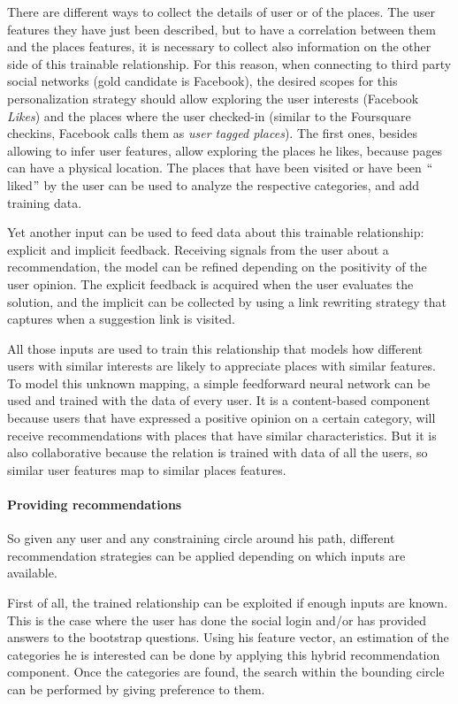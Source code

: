 There are different ways to collect the details of user or of the places. The user features they have just been described, but to have a correlation between them and the places features, it is necessary to collect also information on the other side of this trainable relationship. For this reason, when connecting to third party social networks (gold candidate is Facebook), the desired scopes for this personalization strategy should allow exploring the user interests (Facebook \textit{Likes}) and the places where the user checked-in (similar to the Foursquare checkins, Facebook calls them as \textit{user tagged places}). The first ones, besides allowing to infer user features, allow exploring the places he likes, because pages can have a physical location. The places that have been visited or have been $``$liked$"$  by the user can be used to analyze the respective categories, and add training data.

Yet another input can be used to feed data about this trainable relationship: explicit and implicit feedback. Receiving signals from the user about a recommendation, the model can be refined depending on the positivity of the user opinion. The explicit feedback is acquired when the user evaluates the solution, and the implicit can be collected by using a link rewriting strategy that captures when a suggestion link is visited.

All those inputs are used to train this relationship that models how different users with similar interests are likely to appreciate places with similar features. To model this unknown mapping, a simple feedforward neural network can be used and trained with the data of every user. It is a content-based component because users that have expressed a positive opinion on a certain category, will receive recommendations with places that have similar characteristics. But it is also collaborative because the relation is trained with data of all the users, so similar user features map to similar places features.

\paragraph{Providing recommendations}
So given any user and any constraining circle around his path, different recommendation strategies can be applied depending on which inputs are available.

First of all, the trained relationship can be exploited if enough inputs are known. This is the case where the user has done the social login and/or has provided answers to the bootstrap questions. Using his feature vector, an estimation of the categories he is interested can be done by applying this hybrid recommendation component. Once the categories are found, the search within the bounding circle can be performed by giving preference to them.

